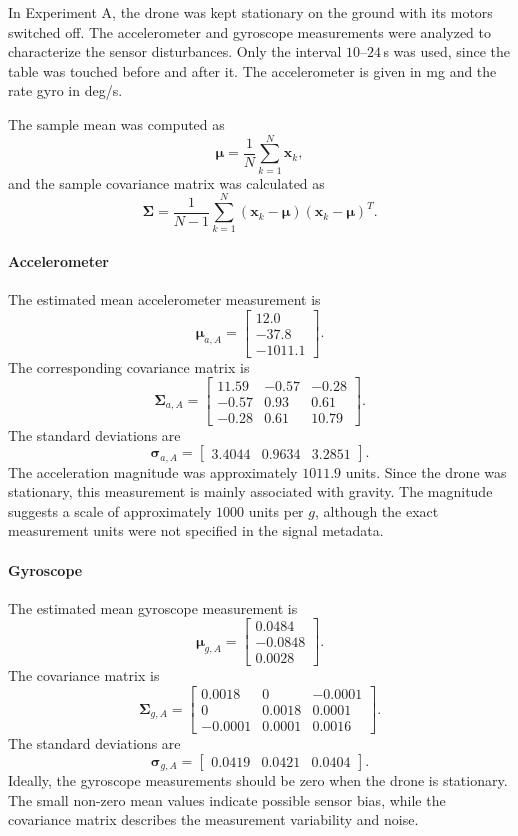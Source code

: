 \documentclass[10pt,a4paper]{article}
\newenvironment{answer}{%
  \begin{tcolorbox}[breakable,enhanced,colback=white,colframe=greyline,
    boxrule=0.6pt,arc=2pt,left=8pt,right=8pt,top=7pt,bottom=7pt,
    before skip=0pt,after skip=12pt]
}{\end{tcolorbox}}
\begin{document}
\begin{answer}
In Experiment A, the drone was kept stationary on the ground
with its motors switched off. The accelerometer and gyroscope
measurements were analyzed to characterize the sensor disturbances.
Only the interval $10$--$24$\,s was used, since the table was touched
before and after it. The accelerometer is given in mg and the rate gyro
in deg/s.

The sample mean was computed as
\[
\boldsymbol{\mu} =
\frac{1}{N}\sum_{k=1}^{N}\mathbf{x}_k,
\]
and the sample covariance matrix was calculated as
\[
\boldsymbol{\Sigma} =
\frac{1}{N-1}
\sum_{k=1}^{N}
(\mathbf{x}_k-\boldsymbol{\mu})
(\mathbf{x}_k-\boldsymbol{\mu})^T.
\]

\paragraph{Accelerometer}
The estimated mean accelerometer measurement is
\[
\boldsymbol{\mu}_{a,A} =
\begin{bmatrix}
12.0\\
-37.8\\
-1011.1
\end{bmatrix}.
\]
The corresponding covariance matrix is
\[
\boldsymbol{\Sigma}_{a,A} =
\begin{bmatrix}
11.59 & -0.57 & -0.28\\
-0.57 & 0.93 & 0.61\\
-0.28 & 0.61 & 10.79
\end{bmatrix}.
\]
The standard deviations are
\[
\boldsymbol{\sigma}_{a,A} =
\begin{bmatrix}
3.4044 & 0.9634 & 3.2851
\end{bmatrix}.
\]
The acceleration magnitude was approximately \(1011.9\)
units. Since the drone was stationary, this measurement is
mainly associated with gravity. The magnitude suggests a
scale of approximately \(1000\) units per \(g\), although
the exact measurement units were not specified in the
signal metadata.

\paragraph{Gyroscope}
The estimated mean gyroscope measurement is
\[
\boldsymbol{\mu}_{g,A} =
\begin{bmatrix}
0.0484\\
-0.0848\\
0.0028
\end{bmatrix}.
\]
The covariance matrix is
\[
\boldsymbol{\Sigma}_{g,A} =
\begin{bmatrix}
0.0018 & 0 & -0.0001\\
0 & 0.0018 & 0.0001\\
-0.0001 & 0.0001 & 0.0016
\end{bmatrix}.
\]
The standard deviations are
\[
\boldsymbol{\sigma}_{g,A} =
\begin{bmatrix}
0.0419 & 0.0421 & 0.0404
\end{bmatrix}.
\]
Ideally, the gyroscope measurements should be zero when
the drone is stationary. The small non-zero mean values
indicate possible sensor bias, while the covariance matrix
describes the measurement variability and noise.


\end{answer}
\end{document}
